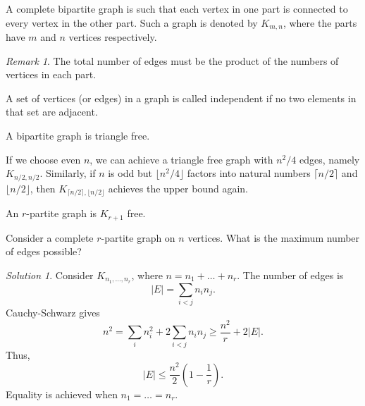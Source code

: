 \documentclass[11pt]{article}
\theoremstyle{definition}
\theoremstyle{remark}
\newtheorem*{remark}{Remark}
\newtheorem*{solution}{Solution}
\numberwithin{equation}{section}
\begin{document}
    \begin{definition}
        A complete bipartite graph is such that each vertex in one part is connected
        to every vertex in the other part. Such a graph is denoted by $K_{m,n}$,
        where the parts have $m$ and $n$ vertices respectively.

        \begin{remark}
            The total number of edges must be the product of the numbers of vertices
            in each part.
        \end{remark}
    \end{definition}

    \begin{definition}
        A set of vertices (or edges) in a graph is called independent if no two
        elements in that set are adjacent.
    \end{definition}

    \begin{lemma}
        A bipartite graph is triangle free.
    \end{lemma}

    \begin{corollary}
        If we choose even $n$, we can achieve a triangle free graph with $n^2 / 4$
        edges, namely $K_{n / 2, n / 2}$. Similarly, if $n$ is odd but $\lfloor n^2 /
        4\rfloor$ factors into natural numbers $\lceil n / 2\rceil$ and $\lfloor n /
        2 \rfloor$, then $K_{\lceil n / 2\rceil, \lfloor n / 2 \rfloor}$ achieves the
        upper bound again.
    \end{corollary}
    
    \begin{lemma}
        An $r$-partite graph is $K_{r + 1}$ free.
    \end{lemma}

    \begin{exercise}
        Consider a complete $r$-partite graph on $n$ vertices. What is the maximum
        number of edges possible?
        \begin{solution}
            Consider $K_{n_1, \dots, n_r}$, where $n = n_1 + \dots + n_r$. The number
            of edges is \[
                |E| = \sum_{i < j} n_i n_j.
            \] Cauchy-Schwarz gives \[
                n^2 = \sum_{i} n_i^2 + 2\sum_{i < j} n_i n_j \geq \frac{n^2}{r} +
                2|E|.
            \] Thus, \[
                |E| \leq \frac{n^2}{2}\left(1 - \frac{1}{r}\right).
            \] Equality is achieved when $n_1 = \dots = n_r$.
        \end{solution}
    \end{exercise}
\end{document}
